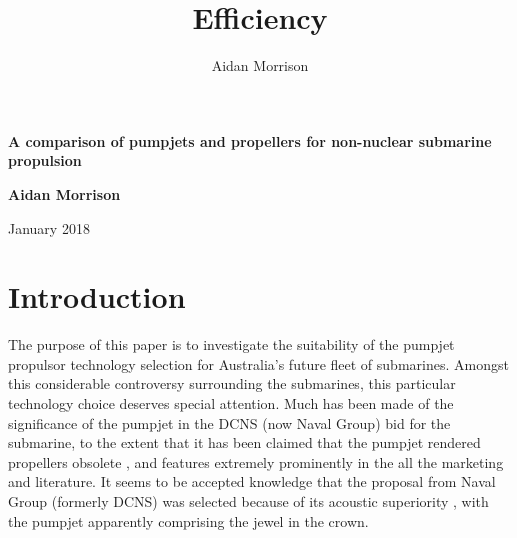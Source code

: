 \documentclass{article}\usepackage[]{graphicx}\usepackage[]{color}
\title{Efficiency}
\author{Aidan Morrison}
\begin{document}
\begin{titlepage}
    \begin{center}
        \vspace*{1cm}

        \vspace{10cm}
        \textbf{\huge A comparison of pumpjets and propellers for non-nuclear submarine propulsion}

        \vspace{0.5cm}


        \vspace{1.5cm}

        \textbf{Aidan Morrison}

        \vspace{1.5cm}
        January 2018

        \vfill



    \end{center}
\end{titlepage}




\newpage

\tableofcontents

\newpage
\setlength{\parskip}{1em}

\section{Introduction} \label{intro}

The purpose of this paper is to investigate the suitability of the pumpjet propulsor technology selection for Australia's future fleet of submarines.  Amongst this considerable controversy surrounding the submarines, this particular technology choice deserves special attention.  Much has been made of the significance of the pumpjet in the DCNS (now Naval Group) bid for the submarine, to the extent that it has been claimed that the pumpjet rendered propellers obsolete \parencite{naval2018}, and features extremely prominently in the all the marketing and literature. It seems to be accepted knowledge that the proposal from Naval Group (formerly DCNS) was selected because of its acoustic superiority \parencite{stewart2016}, with the pumpjet apparently comprising the jewel in the crown.
\end{document}
